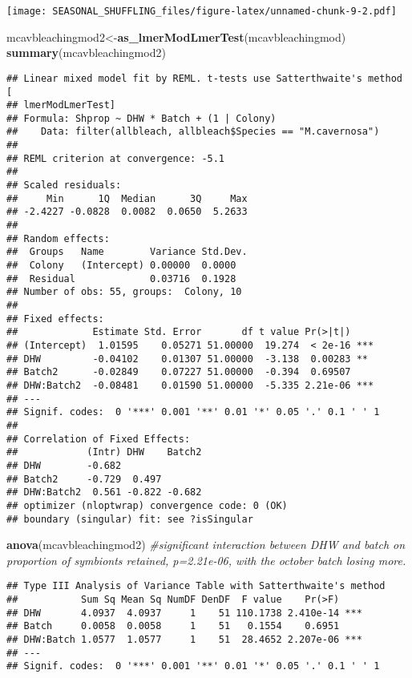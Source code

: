 \documentclass[]{article}
\newenvironment{Shaded}{\begin{snugshade}}{\end{snugshade}}
\newcommand{\CommentTok}[1]{\textcolor[rgb]{0.56,0.35,0.01}{\textit{#1}}}
\newcommand{\KeywordTok}[1]{\textcolor[rgb]{0.13,0.29,0.53}{\textbf{#1}}}
\newcommand{\NormalTok}[1]{#1}
\begin{document}
\texttt{[image: SEASONAL\_SHUFFLING\_files/figure-latex/unnamed-chunk-9-2.pdf]}

\begin{Shaded}
\begin{Highlighting}[]
\NormalTok{  mcavbleachingmod2<-}\KeywordTok{as_lmerModLmerTest}\NormalTok{(mcavbleachingmod)}
  \KeywordTok{summary}\NormalTok{(mcavbleachingmod2)}
\end{Highlighting}
\end{Shaded}

\begin{verbatim}
## Linear mixed model fit by REML. t-tests use Satterthwaite's method [
## lmerModLmerTest]
## Formula: Shprop ~ DHW * Batch + (1 | Colony)
##    Data: filter(allbleach, allbleach$Species == "M.cavernosa")
## 
## REML criterion at convergence: -5.1
## 
## Scaled residuals: 
##     Min      1Q  Median      3Q     Max 
## -2.4227 -0.0828  0.0082  0.0650  5.2633 
## 
## Random effects:
##  Groups   Name        Variance Std.Dev.
##  Colony   (Intercept) 0.00000  0.0000  
##  Residual             0.03716  0.1928  
## Number of obs: 55, groups:  Colony, 10
## 
## Fixed effects:
##             Estimate Std. Error       df t value Pr(>|t|)    
## (Intercept)  1.01595    0.05271 51.00000  19.274  < 2e-16 ***
## DHW         -0.04102    0.01307 51.00000  -3.138  0.00283 ** 
## Batch2      -0.02849    0.07227 51.00000  -0.394  0.69507    
## DHW:Batch2  -0.08481    0.01590 51.00000  -5.335 2.21e-06 ***
## ---
## Signif. codes:  0 '***' 0.001 '**' 0.01 '*' 0.05 '.' 0.1 ' ' 1
## 
## Correlation of Fixed Effects:
##            (Intr) DHW    Batch2
## DHW        -0.682              
## Batch2     -0.729  0.497       
## DHW:Batch2  0.561 -0.822 -0.682
## optimizer (nloptwrap) convergence code: 0 (OK)
## boundary (singular) fit: see ?isSingular
\end{verbatim}

\begin{Shaded}
\begin{Highlighting}[]
  \KeywordTok{anova}\NormalTok{(mcavbleachingmod2) }\CommentTok{#significant interaction between DHW and batch on proportion of symbionts retained, p=2.21e-06, with the october batch losing more.}
\end{Highlighting}
\end{Shaded}

\begin{verbatim}
## Type III Analysis of Variance Table with Satterthwaite's method
##           Sum Sq Mean Sq NumDF DenDF  F value    Pr(>F)    
## DHW       4.0937  4.0937     1    51 110.1738 2.410e-14 ***
## Batch     0.0058  0.0058     1    51   0.1554    0.6951    
## DHW:Batch 1.0577  1.0577     1    51  28.4652 2.207e-06 ***
## ---
## Signif. codes:  0 '***' 0.001 '**' 0.01 '*' 0.05 '.' 0.1 ' ' 1
\end{verbatim}
\end{document}
